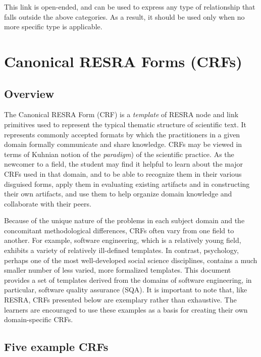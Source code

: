 \begin{itemize}
{This link is open-ended, and can be used to express any type of
relationship that falls outside the above categories. As a result, it
should be used only when no more specific type is applicable.



\section{Canonical RESRA Forms (CRFs)}
\label{sec:crf}

\subsection{Overview}

The Canonical RESRA Form (CRF) is a {\it template\/} of RESRA node and link
primitives used to represent the typical thematic structure of scientific
text.  It represents commonly accepted formats by which the practitioners
in a given domain formally communicate and share knowledge. CRFs may be
viewed in terms of Kuhnian notion of the {\it paradigm\/}) of the
scientific practice. As the newcomer to a field, the student may find it
helpful to learn about the major CRFs used in that domain, and to be able
to recognize them in their various disguised forms, apply them in
evaluating existing artifacts and in constructing their own artifacts, and
use them to help organize domain knowledge and collaborate with their
peers.

Because of the unique nature of the problems in each subject domain and the
concomitant methodological differences, CRFs often vary from one field to
another.  For example, software engineering, which is a relatively young
field, exhibits a variety of relatively ill-defined templates.  In
contrast, psychology, perhaps one of the most well-developed social science
disciplines, contains a much smaller number of less varied, more formalized
templates. This document provides a set of templates derived from the
domains of software engineering, in particular, software quality
assurance (SQA). It is important to note that, like RESRA, CRFs presented
below are exemplary rather than exhaustive. The learners are encouraged to
use these examples as a basis for creating their own domain-specific CRFs.


\subsection{Five example CRFs}

}
\end{itemize}
